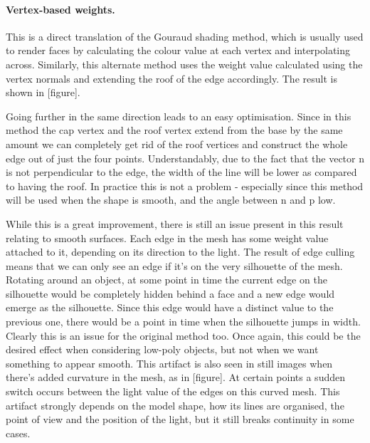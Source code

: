 \documentclass[a4paper, 12pt]{article}
\begin{document}
\paragraph{Vertex-based weights.}
This is a direct translation of the Gouraud shading method, which is usually used to render faces by calculating the colour value at each vertex and interpolating across. Similarly, this alternate method uses the weight value calculated using the vertex normals and extending the roof of the edge accordingly. The result is shown in [figure].

Going further in the same direction leads to an easy optimisation. Since in this method the cap vertex and the roof vertex extend from the base by the same amount we can  completely get rid of the roof vertices and  construct the whole edge out of just the four points. Understandably, due to the fact that the vector n is not perpendicular to the edge, the width of the line will be lower as compared to having the roof. In practice this is not a problem - especially since this method will be used when the shape is smooth, and the angle between n and p low.

While this is a great improvement, there is still an issue present in this result relating to smooth surfaces. Each edge in the mesh has some weight value attached to it, depending on its direction to the light. The result of edge culling means that we can only see an edge if it's on the very silhouette of the mesh. Rotating around an object, at some point in time the current edge on the silhouette would be completely hidden behind a face and a new edge would emerge as the silhouette. Since this edge would have a distinct value to the previous one, there would be a point in time when the silhouette jumps in width. Clearly this is an issue for the original method too. Once again, this could be the desired effect when considering low-poly objects, but not when we want something to appear smooth. This artifact is also seen in still images when there's added curvature in the mesh, as in [figure]. At certain points a sudden switch occurs between the light value of the edges on this curved mesh. This artifact strongly depends on the model shape, how its lines are organised, the point of view and the position of the light, but it still breaks continuity in some cases.
\end{document}
